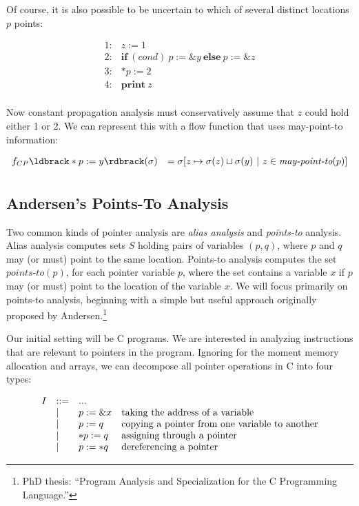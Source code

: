 \documentclass[11pt]{article}
\begin{document}
Of course, it is also possible to be uncertain to which of several distinct locations $p$ points:

\[
\begin{array}{ll}
1: & z := 1\\
2: & \mathbf{if}~ (\textit{cond})~ p := \&y ~\mathbf{else}~ p := \&z\\
3: & *p := 2\\
4: & \mathbf{print}~ z\\
\end{array}
\]

Now constant propagation analysis must conservatively assume that $z$ could hold either 1 or 2.  We can represent this with a flow function that uses may-point-to information:

\[
\begin{array}{ll}

f_{CP}\parg{*p := y}(\sigma) & = \sigma[z \mapsto \sigma(z) \join \sigma(y) ~|~ z \in \textit{may-point-to}(p)]\\[1ex]

\end{array}
\]


\subsection{Andersen's Points-To Analysis}

Two common kinds of pointer analysis are \emph{alias analysis} and
\emph{points-to} analysis. Alias analysis computes sets $S$ holding pairs of
variables $(p,q)$, where $p$ and $q$ may (or must) point to the same location.
Points-to analysis computes the set $\textit{points-to}(p)$, for each pointer
variable $p$, where the set contains a variable $x$ if $p$ may (or must) point
to the location of the variable $x$. We will focus primarily on points-to
analysis, beginning with a simple but useful approach originally proposed by
Andersen.\footnote{PhD thesis: ``Program Analysis and Specialization for the C
Programming Language.''}

Our initial setting will be C programs. We are interested in analyzing
instructions that are relevant to pointers in the program. Ignoring for the
moment memory allocation and arrays, we can decompose all pointer operations in
C into four types:

\[
\begin{array}{llll}
I & ::= & ... \\
  & \mathrel{\mid} & p := \&x & \mbox{taking the address of a variable} \\
  & \mathrel{\mid} & p := q & \mbox{copying a pointer from one variable to another}\\
  & \mathrel{\mid} & *p := q & \mbox{assigning through a pointer}\\
  & \mathrel{\mid} & p := *q & \mbox{dereferencing a pointer} \\
\end{array}
\]
\end{document}
